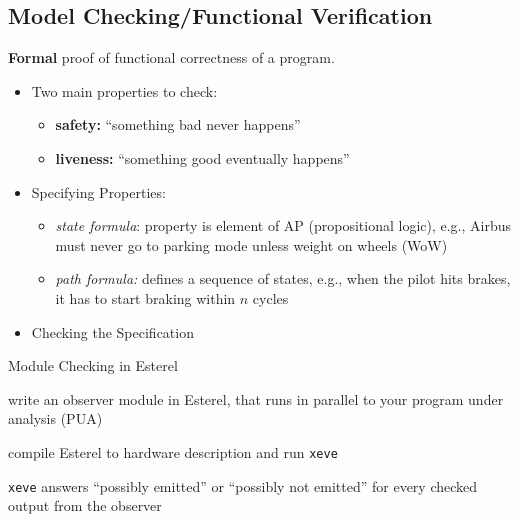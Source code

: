 \documentclass[german]{latex4ei/latex4ei_sheet}
\begin{document}
\begin{sectionbox}
\subsection{Model Checking/Functional Verification}
\textbf{Formal} proof of functional correctness of a program.
\begin{itemize}
\item Two main properties to check:
\begin{itemize}
\item \textbf{safety:} "`something bad never happens"'
\item \textbf{liveness:} "`something good eventually happens"'
\end{itemize}
\item Specifying Properties:
\begin{itemize}
\item \textit{state formula}: property is element of AP (propositional logic), e.g., Airbus must never go to parking mode unless
weight on wheels (WoW)
\item \textit{path formula:} defines a sequence of states, e.g., when the pilot hits brakes, it has to start braking within $n$ cycles
\end{itemize}
\item Checking the Specification
\end{itemize}
\begin{cookbox}{Module Checking in Esterel}
	\item write an observer module in Esterel, that runs in parallel to your program under analysis (PUA)
	\item compile Esterel to hardware description and run \texttt{xeve}
	\item \texttt{xeve} answers "`possibly emitted"' or "`possibly not emitted"' for every checked output from the observer
\end{cookbox}
\end{sectionbox}
\end{document}
